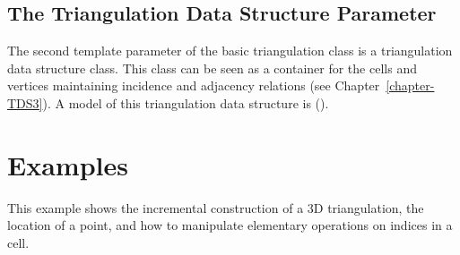 



\subsection{The Triangulation Data Structure Parameter}
\label{Triangulation3-sec-tds}

The second template parameter of the basic triangulation class
 is a triangulation 
data structure class.  This class can be seen as a container for the
cells and vertices maintaining incidence and adjacency relations (see
Chapter~\ref{chapter-TDS3}).  A model of this triangulation data
structure is  
().

\section{Examples}
\label{Triangulation3-sec-examples}
This example shows the incremental construction of a 3D triangulation, 
the location of a point, and how to manipulate elementary operations
on indices in a cell.


